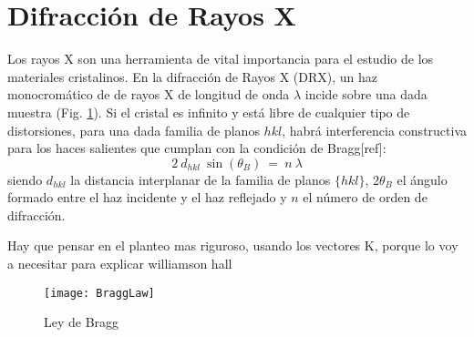 \cite{Mainprice2011}
\section{Difracción de Rayos X}\label{S:DRX}
Los rayos X son una herramienta de vital importancia para el estudio de los materiales cristalinos. 
En la difracción de Rayos X (DRX), un haz monocromático de de rayos X de longitud de onda $\lambda$ incide sobre una dada muestra (Fig. \ref{fig:Bragg}). 
Si el cristal es infinito y está libre de cualquier tipo de distorsiones, para una dada familia de planos ${hkl}$, habrá interferencia constructiva para los haces salientes que cumplan con la condición de Bragg[ref]:
\begin{equation}
  2 \ d_{hkl} \ \sin(\theta_{B}) \ = \ n \ \lambda
  \label{eq:Bragg}
\end{equation}
\noindent
siendo $d_{hkl}$ la distancia interplanar de la familia de planos $\{hkl\}$, 2$\theta_{B}$ el ángulo formado entre el haz incidente y el haz reflejado y $n$ el número de orden de difracción. 

Hay que pensar en el planteo mas riguroso, usando los vectores K, porque lo voy a necesitar para explicar williamson hall

\begin{figure}[htb!]
  \centering
  \texttt{[image: BraggLaw]}
  \caption{Ley de Bragg}
  \label{fig:Bragg}
\end{figure}

